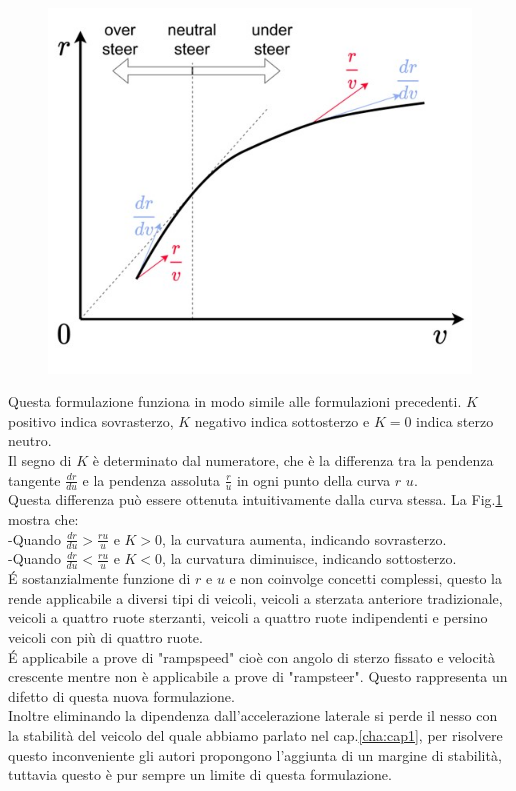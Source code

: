\begin{figure}[!h]
    \centering
    \includegraphics[scale=0.6]{Immagini/Understeer Gradient/K_cinesi.jpg}
    \caption{}
    \label{fig:K_cinesi}
\end{figure}
Questa formulazione funziona in modo simile alle formulazioni precedenti. 
$K$ positivo indica sovrasterzo, $K$ negativo indica sottosterzo e $K=0$ indica sterzo neutro.\\ 
Il segno di $K$ è determinato dal numeratore, che è la differenza tra la pendenza tangente $\frac{dr}{du}$ e la pendenza assoluta $\frac{r}{u}$ in ogni punto della curva $r$  $u$.\\ 
Questa differenza può essere ottenuta intuitivamente dalla curva stessa. La Fig.\ref{fig:K_cinesi} mostra che:\\ 
-Quando $\frac{dr}{du} > \frac{ru}{u}$ e $K > 0$, la curvatura aumenta, indicando sovrasterzo.\\ 
-Quando $\frac{dr}{du} < \frac{ru}{u}$ e $K < 0$, la curvatura diminuisce, indicando sottosterzo.\\
\'E sostanzialmente funzione di $r$ e $u$ e non coinvolge concetti complessi, questo la rende applicabile a diversi tipi
di veicoli, veicoli a sterzata anteriore tradizionale, veicoli a quattro ruote sterzanti, veicoli a quattro ruote
indipendenti e persino veicoli con più di quattro ruote.\\ 
\'E applicabile a prove di "rampspeed" cioè con angolo di sterzo fissato e velocità crescente mentre non è applicabile a
prove di "rampsteer".
Questo rappresenta un difetto di questa nuova formulazione.\\
Inoltre eliminando la dipendenza dall'accelerazione laterale si perde il nesso con la stabilità del veicolo del quale
abbiamo parlato nel cap.\ref{cha:cap1}, per risolvere questo inconveniente gli autori propongono l'aggiunta di un margine di stabilità, tuttavia questo è pur sempre un limite di questa formulazione.


